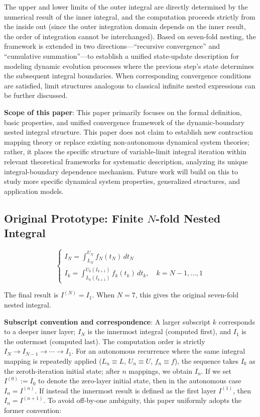 \documentclass[11pt,a4paper]{amsart}
\begin{document}
The upper and lower limits of the outer integral are directly determined by the numerical result of the inner integral, and the computation proceeds strictly from the inside out (since the outer integration domain depends on the inner result, the order of integration cannot be interchanged). Based on seven-fold nesting, the framework is extended in two directions---``recursive convergence'' and ``cumulative summation''---to establish a unified state-update description for modeling dynamic evolution processes where the previous step's state determines the subsequent integral boundaries. When corresponding convergence conditions are satisfied, limit structures analogous to classical infinite nested expressions can be further discussed.

\textbf{Scope of this paper}: This paper primarily focuses on the formal definition, basic properties, and unified convergence framework of the dynamic-boundary nested integral structure. This paper does not claim to establish new contraction mapping theory or replace existing non-autonomous dynamical system theories; rather, it places the specific structure of variable-limit integral iteration within relevant theoretical frameworks for systematic description, analyzing its unique integral-boundary dependence mechanism. Future work will build on this to study more specific dynamical system properties, generalized structures, and application models.

\subsection{Original Prototype: Finite \texorpdfstring{$N$}{N}-fold Nested Integral}

\begin{equation}
\label{eq:nested-finite}
\begin{cases}
I_N = \displaystyle\int_{L_N}^{U_N} f_N(t_N) \, dt_N \\
I_k = \displaystyle\int_{L_k(I_{k+1})}^{U_k(I_{k+1})} f_k(t_k) \, dt_k, \quad k = N-1, \dots, 1
\end{cases}
\end{equation}

The final result is $I^{(N)} = I_1$. When $N = 7$, this gives the original seven-fold nested integral.

\textbf{Subscript convention and correspondence}: A larger subscript $k$ corresponds to a deeper inner layer; $I_N$ is the innermost integral (computed first), and $I_1$ is the outermost (computed last). The computation order is strictly $I_N \to I_{N-1} \to \cdots \to I_1$. For an autonomous recurrence where the same integral mapping is repeatedly applied ($L_n \equiv L$, $U_n \equiv U$, $f_n \equiv f$), the sequence takes $I_0$ as the zeroth-iteration initial state; after $n$ mappings, we obtain $I_n$. If we set $I^{(0)} := I_0$ to denote the zero-layer initial state, then in the autonomous case $I_n = I^{(n)}$. If instead the innermost result is defined as the first layer $I^{(1)}$, then $I_n = I^{(n+1)}$. To avoid off-by-one ambiguity, this paper uniformly adopts the former convention:
\end{document}

